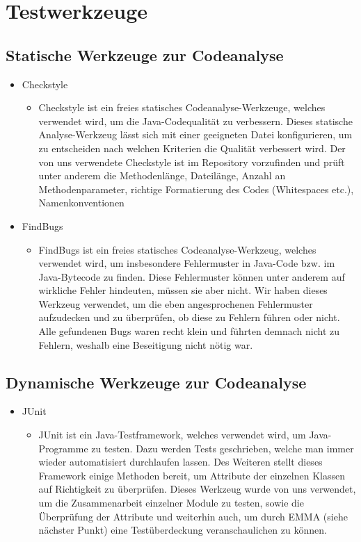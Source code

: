 \section{Testwerkzeuge}
\subsection{Statische Werkzeuge zur Codeanalyse}
\begin{itemize}
\item Checkstyle
\begin{itemize} 
\item Checkstyle ist ein freies statisches Codeanalyse-Werkzeuge, welches verwendet wird, um die Java-Codequalität zu verbessern.
	Dieses statische Analyse-Werkzeug lässt sich mit einer geeigneten Datei konfigurieren, um zu entscheiden nach welchen Kriterien
	die Qualität verbessert wird. Der von uns verwendete Checkstyle ist im Repository vorzufinden und prüft unter anderem die Methodenlänge, 
	Dateilänge, Anzahl an Methodenparameter, richtige Formatierung des Codes (Whitespaces etc.), Namenkonventionen 
	\end{itemize}
\end{itemize}

\begin{itemize}
\item FindBugs
\begin{itemize} 
\item FindBugs ist ein freies statisches Codeanalyse-Werkzeug, welches verwendet wird, um insbesondere Fehlermuster in Java-Code bzw. im Java-Bytecode zu finden.
	Diese Fehlermuster können unter anderem auf wirkliche Fehler hindeuten, müssen sie aber nicht.
	Wir haben dieses Werkzeug verwendet, um die eben angesprochenen Fehlermuster aufzudecken und zu überprüfen, ob diese zu Fehlern
	führen oder nicht. Alle gefundenen Bugs waren recht klein und führten demnach nicht zu Fehlern, weshalb eine Beseitigung nicht nötig war.
\end{itemize}
\end{itemize}

\subsection{Dynamische Werkzeuge zur Codeanalyse}

\begin{itemize}
\item JUnit
\begin{itemize} 
\item JUnit ist ein Java-Testframework, welches verwendet wird, um Java-Programme zu testen. Dazu werden Tests geschrieben, welche man immer wieder automatisiert durchlaufen lassen.
	Des Weiteren stellt dieses Framework einige Methoden bereit, um Attribute der einzelnen Klassen auf Richtigkeit zu überprüfen.
	Dieses Werkzeug wurde von uns verwendet, um die Zusammenarbeit einzelner Module zu testen, sowie die Überprüfung der Attribute und weiterhin auch, um durch EMMA (siehe nächster Punkt) 
	eine Testüberdeckung veranschaulichen zu können.
	\end{itemize}
\end{itemize}

